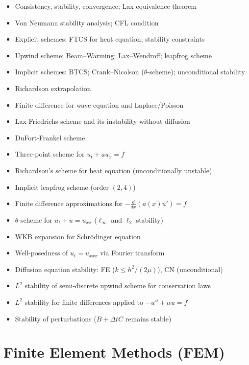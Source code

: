 \documentclass{amsart}
\begin{document}
\begin{itemize}
  \item Consistency, stability, convergence; Lax equivalence theorem
  \item Von Neumann stability analysis; CFL condition
  \item Explicit schemes: FTCS for heat equation; stability constraints
  \item Upwind scheme; Beam--Warming; Lax--Wendroff; leapfrog scheme
  \item Implicit schemes: BTCS; Crank--Nicolson ($\theta$-scheme); unconditional stability
  \item Richardson extrapolation
  \item Finite difference for wave equation and Laplace/Poisson
  \item Lax-Friedrichs scheme and its instability without diffusion
  \item DuFort-Frankel scheme
  \item Three-point scheme for $u_t + au_x = f$
  \item Richardson's scheme for heat equation (unconditionally unstable)
  \item Implicit leapfrog scheme (order $(2,4)$)
  \item Finite difference approximations for $-\frac{d}{dx}(a(x)u') = f$
  \item $\theta$-scheme for $u_t + u = u_{xx}$ ($\ell_\infty$ and $\ell_2$ stability)
  \item WKB expansion for Schr\"odinger equation
  \item Well-posedness of $u_t = u_{xxx}$ via Fourier transform
  \item Diffusion equation stability: FE ($k \leq h^2/(2\mu)$), CN (unconditional)
  \item $L^2$ stability of semi-discrete upwind scheme for conservation laws
  \item $L^2$ stability for finite differences applied to $-u'' + \alpha u = f$
  \item Stability of perturbations ($B + \Delta t C$ remains stable)
\end{itemize}

\section{Finite Element Methods (FEM)}
\end{document}
